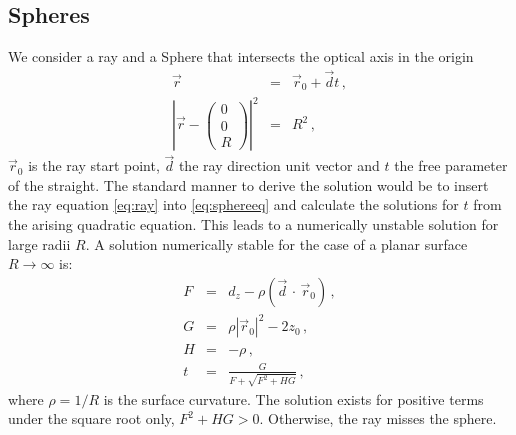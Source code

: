 \documentclass[12pt,a4paper,twoside,openright,BCOR10mm,headsepline,titlepage,abstracton,chapterprefix,final]{scrreprt}
\newcommand\Location{\Vector{r}}
\newcommand\Vector[1]{\vec{#1}}
\newcommand{\scpm}[2]{(#1\,\cdot\,#2)}
\begin{document}
\subsection{Spheres}
We consider a ray and a Sphere that intersects the optical axis in the origin
\begin{eqnarray}
 \Location &=& \Location_0 + \vec{d} t \label{eq:ray}\,,\\
 \left| \Location - \begin{pmatrix} 0 \\ 0 \\ R \end{pmatrix} \right|^2 &=& R^2\,, \label{eq:sphereeq}
\end{eqnarray}
$\Location_0$ is the ray start point, $\vec{d}$ the ray direction unit vector and $t$ the free parameter of the straight.
The standard manner to derive the solution would be to insert the ray equation \eqref{eq:ray} into
\eqref{eq:sphereeq} and calculate the solutions for $t$ from the arising quadratic equation. This leads to a numerically unstable solution
for large radii $R$.
A solution numerically stable for the case of a planar surface $R \rightarrow \infty$ is:
\begin{subequations}
\label{eq:spheresolution}
\begin{eqnarray}
   F &=& d_z - \rho \scpm{\vec{d}}{\Location_0}\,, \\
   G &=& \rho |\Location_0|^2 - 2 z_0\,, \\
   H &=& - \rho\,, \\
   t &=& \frac{G}{ F + \sqrt{F^2 + H G} }\,, \label{eq:tsolsphere}
\end{eqnarray}
\end{subequations}
where $\rho = 1 / R$ is the surface curvature. 
The solution exists for positive terms under the square root only, $F^2 + H G > 0$. 
Otherwise, the ray misses the sphere.
\end{document}
